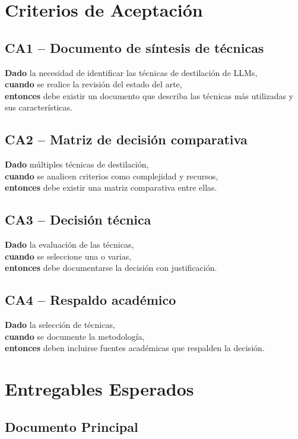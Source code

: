 \documentclass[12pt]{article}
\begin{document}
	\section{Criterios de Aceptación}
	
	\subsection*{CA1 -- Documento de síntesis de técnicas}
	\textbf{Dado} la necesidad de identificar las técnicas de destilación de LLMs, \\
	\textbf{cuando} se realice la revisión del estado del arte, \\
	\textbf{entonces} debe existir un documento que describa las técnicas más utilizadas y sus características.
	
	\subsection*{CA2 -- Matriz de decisión comparativa}
	\textbf{Dado} múltiples técnicas de destilación, \\
	\textbf{cuando} se analicen criterios como complejidad y recursos, \\
	\textbf{entonces} debe existir una matriz comparativa entre ellas.
	
	\subsection*{CA3 -- Decisión técnica}
	\textbf{Dado} la evaluación de las técnicas, \\
	\textbf{cuando} se seleccione una o varias, \\
	\textbf{entonces} debe documentarse la decisión con justificación.
	
	\subsection*{CA4 -- Respaldo académico}
	\textbf{Dado} la selección de técnicas, \\
	\textbf{cuando} se documente la metodología, \\
	\textbf{entonces} deben incluirse fuentes académicas que respalden la decisión.
	
	\section{Entregables Esperados}
	
	\subsection{Documento Principal}
	
\end{document}
